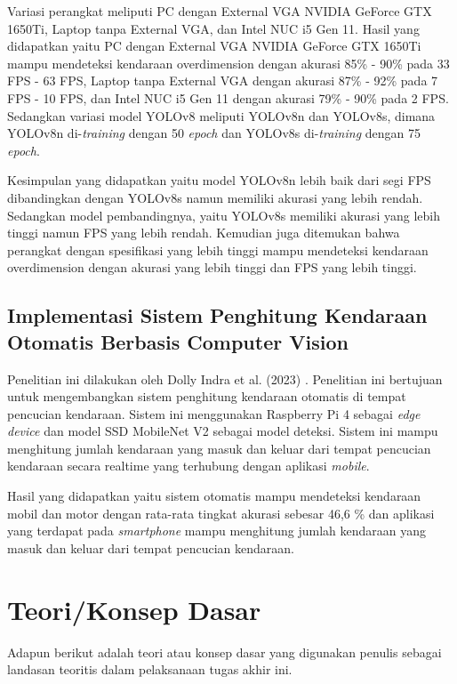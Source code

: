 Variasi perangkat meliputi PC dengan External VGA NVIDIA GeForce GTX 1650Ti, Laptop tanpa External VGA, dan Intel NUC i5 Gen 11. Hasil yang didapatkan yaitu PC dengan External VGA NVIDIA GeForce GTX 1650Ti mampu mendeteksi kendaraan overdimension dengan akurasi 85\% - 90\% pada 33 FPS - 63 FPS, Laptop tanpa External VGA dengan akurasi 87\% - 92\% pada 7 FPS - 10 FPS, dan Intel NUC i5 Gen 11 dengan akurasi 79\% - 90\% pada 2 FPS. Sedangkan variasi model YOLOv8 meliputi YOLOv8n dan YOLOv8s, dimana YOLOv8n di-\emph{training} dengan 50 \emph{epoch} dan YOLOv8s di-\emph{training} dengan 75 \emph{epoch}.

Kesimpulan yang didapatkan yaitu model YOLOv8n lebih baik dari segi FPS dibandingkan dengan YOLOv8s namun memiliki akurasi yang lebih rendah. Sedangkan model pembandingnya, yaitu YOLOv8s memiliki akurasi yang lebih tinggi namun FPS yang lebih rendah. Kemudian juga ditemukan bahwa perangkat dengan spesifikasi yang lebih tinggi mampu mendeteksi kendaraan overdimension dengan akurasi yang lebih tinggi dan FPS yang lebih tinggi.

\subsection{Implementasi Sistem Penghitung Kendaraan Otomatis Berbasis Computer Vision}
\label{subsec:implementasisistemhitungkendaraan}
Penelitian ini dilakukan oleh Dolly Indra et al. (2023) \parencite*{dolly2023}. Penelitian ini bertujuan untuk mengembangkan sistem penghitung kendaraan otomatis di tempat pencucian kendaraan. Sistem ini menggunakan Raspberry Pi 4 sebagai \emph{edge device} dan model SSD MobileNet V2 sebagai model deteksi. Sistem ini mampu menghitung jumlah kendaraan yang masuk dan keluar dari tempat pencucian kendaraan secara realtime yang terhubung dengan aplikasi \emph{mobile}.

Hasil yang didapatkan yaitu sistem otomatis mampu mendeteksi kendaraan mobil dan motor dengan rata-rata tingkat akurasi sebesar 46,6 \% dan aplikasi yang terdapat pada \emph{smartphone} mampu menghitung jumlah kendaraan yang masuk dan keluar dari tempat pencucian kendaraan.

\section{Teori/Konsep Dasar}
\label{sec:teorikonsepdasar}
Adapun berikut adalah teori atau konsep dasar yang digunakan penulis sebagai landasan teoritis dalam pelaksanaan tugas akhir ini.


